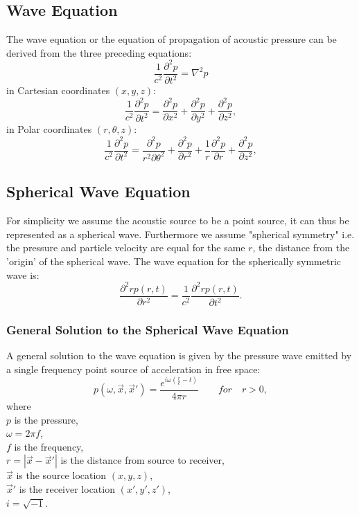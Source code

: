 \subsection{Wave Equation}
The wave equation or the equation of propagation of acoustic pressure can be derived from the three preceding equations:
\begin{equation}
    \frac{1}{c^2}\frac{\partial^2p}{\partial t^2} = \nabla^2p
\end{equation}
in Cartesian coordinates $(x,y,z)$:
\begin{equation}
    \frac{1}{c^2}\frac{\partial^2p}{\partial t^2} = \frac{\partial^2p}{\partial x^2} + \frac{\partial^2p}{\partial y^2} + \frac{\partial^2p}{\partial z^2},
\end{equation}
in Polar coordinates $(r,\theta, z)$:
\begin{equation}
    \frac{1}{c^2}\frac{\partial^2p}{\partial t^2} = \frac{\partial^2p}{r^2\partial \theta^2} + \frac{\partial^2p}{\partial r^2} + \frac{1}{r}\frac{\partial^2p}{\partial r} + \frac{\partial^2p}{\partial z^2},
\end{equation}

\subsection{Spherical Wave Equation}

For simplicity we assume the acoustic source to be a point source, it can thus be represented as a spherical wave. Furthermore we assume "spherical symmetry" i.e. the pressure and particle velocity are equal for the same $r$, the distance from the 'origin' of the spherical wave. The wave equation for the spherically symmetric wave is\cite{Waves2004}:
\begin{equation}
    \frac{\partial^2rp(r,t)}{\partial r^2} = \frac{1}{c^2}\frac{\partial^2rp(r,t)}{\partial t^2}.
\end{equation}
\subsubsection{General Solution to the Spherical Wave Equation}
A general solution to the wave equation is given by the pressure wave emitted by a single frequency point source of acceleration in free space\cite{Allen1979}:
\begin{equation}
    p(\omega,\Vec{x},\Vec{x}') = \frac{e^{i\omega(\frac{r}{c}-t)}}{4\pi r}\quad\quad for\quad r > 0,
    \label{eq:point_source}
\end{equation}
where\\
$p$ is the pressure,\\
$\omega=2\pi f$,\\
$f$ is the frequency,\\
$r=|\Vec{x}-\Vec{x}'|$ is the distance from source to receiver,\\
$\Vec{x}$ is the source location $(x,y,z)$,\\
$\Vec{x}'$ is the receiver location $(x',y',z')$,\\
$i=\sqrt{-1}$.\\


